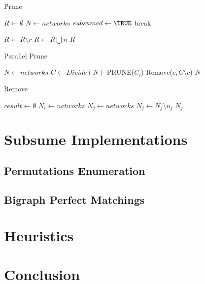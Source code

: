 \documentclass{article}
\begin{document}
\begin{algorithm}[H]
	\caption{Prune} 
	\begin{algorithmic}
	    \STATE $R \leftarrow \emptyset$
	    \STATE $N \leftarrow networks$
                    \STATE $subsumed \leftarrow \TRUE$
                    \STATE break
                \ENDIF
                
                    \STATE $R \leftarrow R \setminus r$
                \ENDIF
            \ENDFOR
                \STATE $R \leftarrow R \bigcup n$
            \ENDIF
        \ENDFOR
        \RETURN $R$
    \end{algorithmic}
\end{algorithm}

\begin{algorithm}[H]
	\caption{Parallel Prune} 
	\begin{algorithmic}
	    \STATE $N \leftarrow networks$
	    \STATE $C \leftarrow Divide(N)$ 
	    \STATE PRUNE($C_i$)
            \STATE Remove($c, C \setminus c$)
        \ENDFOR
        \RETURN $N$
    \end{algorithmic}
\end{algorithm}

\begin{algorithm}[H]
	\caption{Remove} 
	\begin{algorithmic}
	    \STATE $result \leftarrow \emptyset$
	    \STATE $N_i \leftarrow networks$
	    \STATE $N_j \leftarrow networks$
                    \STATE $N_j \leftarrow N_j \setminus n_j$
                \ENDIF
            \ENDFOR
        \ENDFOR
        \RETURN $N_j$
    \end{algorithmic}
\end{algorithm}

\section{Subsume Implementations}
\subsection{Permutations Enumeration}
\subsection{Bigraph Perfect Matchings}

\section{Heuristics}

\section{Conclusion}

\end{document}
